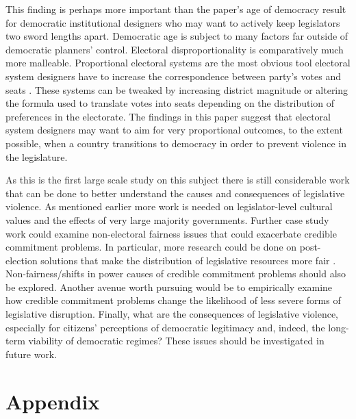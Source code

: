 \documentclass[a4paper]{article}\usepackage[]{graphicx}\usepackage[]{color}
\begin{document}
This finding is perhaps more important than the paper's age of democracy result for democratic institutional designers who may want to actively keep legislators two sword lengths apart. Democratic age is subject to many factors far outside of democratic planners' control. Electoral disproportionality is comparatively much more malleable. Proportional electoral systems are the most obvious tool electoral system designers have to increase the correspondence between party's votes and seats \citep{Carey2011}. These systems can be tweaked by increasing district magnitude or altering the formula used to translate votes into seats depending on the distribution of preferences in the electorate. The findings in this paper suggest that electoral system designers may want to aim for very proportional outcomes, to the extent possible, when a country transitions to democracy in order to prevent violence in the legislature. 

As this is the first large scale study on this subject there is still considerable work that can be done to better understand the causes and consequences of legislative violence. As mentioned earlier more work is needed on legislator-level cultural values and the effects of very large majority governments. Further case study work could examine non-electoral fairness issues that could exacerbate credible commitment problems. In particular, more research could be done on post-election solutions that make the distribution of legislative resources more fair \cite[for example see][who examined informal minority party access to power in Japan's Diet]{Wolfe2004}. Non-fairness/shifts in power causes of credible commitment problems should also be explored. Another avenue worth pursuing would be to empirically examine how credible commitment problems change the likelihood of less severe forms of legislative disruption. Finally, what are the consequences of legislative violence, especially for citizens' perceptions of democratic legitimacy and, indeed, the long-term viability of democratic regimes? These issues should be investigated in future work. 





\theendnotes


\clearpage
\section*{Appendix}
\end{document}
